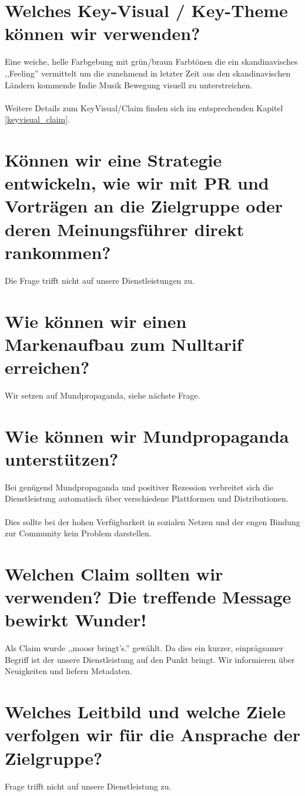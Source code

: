 \section{Welches Key-Visual / Key-Theme können wir verwenden?}
Eine weiche, helle Farbgebung mit grün/braun Farbtönen die ein skandinavisches
,,Feeling'' vermittelt um die zunehmend in letzter Zeit aus den skandinavischen
Ländern kommende Indie Musik Bewegung visuell zu  unterstreichen.
\\
\\
Weitere Details zum KeyVisual/Claim finden sich im entsprechenden Kapitel
\ref{keyvisual_claim}.

\section{Können wir eine Strategie entwickeln, wie wir mit PR und Vorträgen an die Zielgruppe oder deren Meinungsführer direkt rankommen?}
Die Frage trifft nicht auf unsere Dienstleistungen zu.

\section{Wie können wir einen Markenaufbau zum Nulltarif erreichen?}
Wir setzen auf Mundpropaganda, siehe nächste Frage.

\section{Wie können wir Mundpropaganda unterstützen?}
Bei genügend Mundpropaganda und positiver Rezession verbreitet sich die
Dienstleistung automatisch über verschiedene Plattformen und Distributionen.
\\
\\
Dies sollte bei der hohen Verfügbarkeit in sozialen Netzen und der engen Bindung
zur Community kein Problem darstellen.

\section{Welchen Claim sollten wir verwenden? Die treffende Message bewirkt Wunder!}
Als Claim wurde ,,moosr bringt's.'' gewählt. Da dies ein kurzer, einprägsamer
Begriff ist der unsere Dienstleistung auf den Punkt bringt. Wir informieren über
Neuigkeiten und liefern Metadaten.

\section{Welches Leitbild und welche Ziele verfolgen wir für die Ansprache der Zielgruppe?}
Frage trifft nicht auf unsere Dienstleistung zu.
